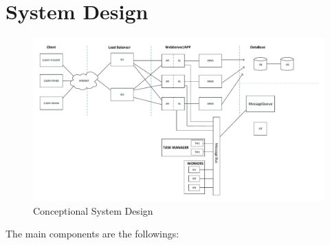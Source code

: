 \section{System Design}


\begin{figure}[!ht]
	\includegraphics[width=\textwidth]{figures/atfogo_rendszerterv_teljes.pdf}
	\caption[Conceptional System Design]{Conceptional System Design\footnotemark}
	\label{fig:conceptional-system-design}
\end{figure}



The main components are the followings:

